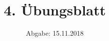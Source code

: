 
\usepackage{longtable}
\usepackage{wrapfig}
\usepackage{ dsfont }
\usepackage{tcolorbox}
\subject{SMD-Abgabe}
\title{4. Übungsblatt}
\date{%
  Abgabe: 15.11.2018
}


  \setlength{\parindent}{0em}
  \maketitle
  \thispagestyle{empty}
  \newpage

  \newenvironment{console1}[1]
  {\begin{center}
  \begin{minipage}[t]{0.99\linewidth}
  \begin{tcolorbox}[colback=gray!5,colframe=black!40!black,title= Ausgabe des Programms: #1 ]
    }
    {
  \end{tcolorbox}
  \end{minipage}
  \end{center}
  }


%
%



